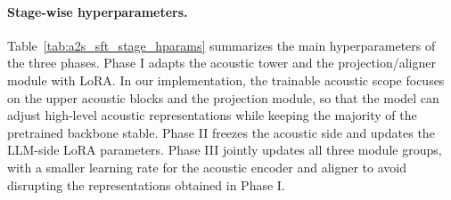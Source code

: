 \documentclass{article}
\begin{document}
\paragraph{Stage-wise hyperparameters.}
Table~\ref{tab:a2s_sft_stage_hparams} summarizes the main hyperparameters of the
three phases. Phase I adapts the acoustic tower and the projection/aligner module
with LoRA. In our implementation, the trainable acoustic scope focuses on the
upper acoustic blocks and the projection module, so that the model can adjust
high-level acoustic representations while keeping the majority of the pretrained
backbone stable. Phase II freezes the acoustic side and updates the LLM-side
LoRA parameters. Phase III jointly updates all three module groups, with a smaller
learning rate for the acoustic encoder and aligner to avoid disrupting the
representations obtained in Phase I.
\end{document}
